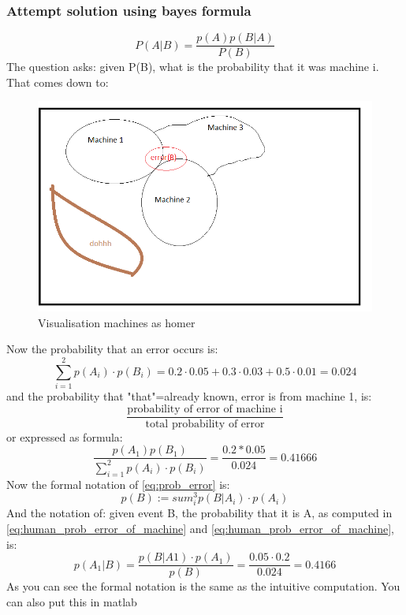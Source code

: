 \subsubsection{Attempt solution using bayes formula} 
\begin{equation}
    P(A|B)=\frac{p(A)p(B|A)}{P(B)}
\end{equation}
The question asks: given P(B), what is the probability that it was machine i. That comes down to: 
\begin{figure}
    \centering
    \includegraphics{images/lectureNotes8_1_3_Bayes.png}
    \caption{Visualisation machines as homer}
    \label{fig:my_label}
\end{figure}
Now the probability that an error occurs is: 
\begin{equation}
    \sum_{i=1}^2 p(A_i)\cdot p(B_i)=0.2\cdot 0.05+0.3\cdot 0.03+0.5\cdot0.01=0.024
    \label{eq:prob_error}
\end{equation}
and the probability that "that"=already known, error is from machine 1, is:
\begin{equation}
    \frac{\text{probability of error of machine i}}{\text{total probability of error}}
    \label{eq:human_prob_error_of_machine}
\end{equation}
or expressed as formula:
\begin{equation}
    \frac{p(A_1)p(B_1)}{\sum_{i=1}^2 p(A_i)\cdot p(B_i)}=\frac{0.2*0.05}{0.024}=0.41666
    \label{eq:prob_error_of_machine}
\end{equation}
Now the formal notation of \cref{eq:prob_error} is:
\begin{equation}
    p(B):=sum_i^3 p(B|A_i)\cdot p(A_i)
\end{equation}
And the notation of: given event B, the probability that it is A, as computed in \cref{eq:human_prob_error_of_machine} and \cref{eq:human_prob_error_of_machine}, is:
\begin{equation}
    p(A_1|B)=\frac{p(B|A1)\cdot p(A_1)}{p(B)}=\frac{0.05\cdot 0.2}{0.024}=0.4166
\end{equation}
As you can see the formal notation is the same as the intuitive computation. You can also put this in matlab


